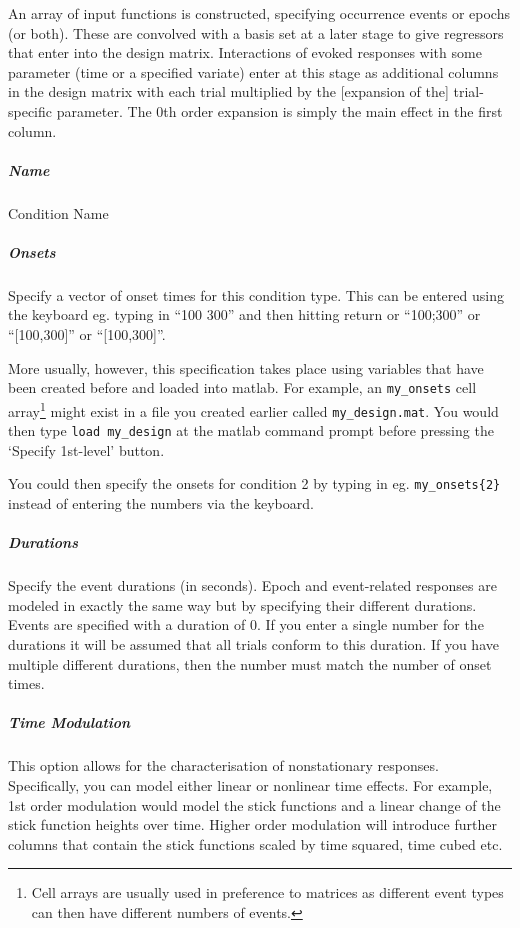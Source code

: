 An array of input functions is constructed, specifying occurrence events or epochs (or both). These are convolved with a basis set at a later stage to give regressors that enter into the design matrix. Interactions of evoked responses with some parameter (time or a specified variate) enter at this stage as additional columns in the design matrix with each trial multiplied by the [expansion of the] trial-specific parameter. The 0th order expansion is simply the main effect in the first column.

\subparagraph{Name}

Condition Name

\subparagraph{Onsets}

Specify a vector of onset times for this condition type. This can be entered using the keyboard eg. typing in ``100 300'' and then hitting return or ``100;300'' or ``[100,300]'' or ``[100,300]''.

More usually, however, this specification takes place using variables that have been created before and loaded into matlab. For example, an \verb!my_onsets! cell array\footnote{Cell arrays are usually used in preference to matrices as different event types can then have different numbers of events.} might exist in a file you created earlier called \verb!my_design.mat!. You would then type \verb!load my_design! at the matlab command prompt before pressing the `Specify 1st-level' button. 

You could then specify the onsets for condition 2 by typing in eg. \verb!my_onsets{2}! instead of entering the numbers via the keyboard.


\subparagraph{Durations}

Specify the event durations (in seconds). Epoch and event-related responses are modeled in exactly the same way but by specifying their different durations.  Events are specified with a duration of 0.  If you enter a single number for the durations it will be assumed that all trials conform to this duration. If you have multiple different durations, then the number must match the number of onset times.

\subparagraph{Time Modulation}

This option allows for the characterisation of nonstationary responses.  Specifically, you can model either linear or nonlinear time effects. For example, 1st order modulation would model the stick functions and a linear change of the stick function heights over time. Higher order modulation will introduce further columns that contain the stick functions scaled by time squared, time cubed etc.

